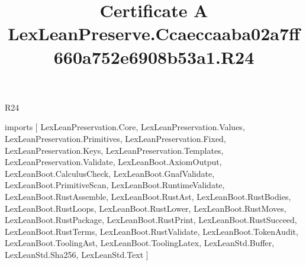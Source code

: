 \begin{lexlean}{R24}
\title{Certificate A LexLeanPreserve.Ccaeccaaba02a7ff660a752e6908b53a1.R24}
\begin{coremodule}
imports [
  LexLeanPreservation.Core,
  LexLeanPreservation.Values,
  LexLeanPreservation.Primitives,
  LexLeanPreservation.Fixed,
  LexLeanPreservation.Keys,
  LexLeanPreservation.Templates,
  LexLeanPreservation.Validate,
  LexLeanBoot.AxiomOutput,
  LexLeanBoot.CalculusCheck,
  LexLeanBoot.GnafValidate,
  LexLeanBoot.PrimitiveScan,
  LexLeanBoot.RuntimeValidate,
  LexLeanBoot.RustAssemble,
  LexLeanBoot.RustAst,
  LexLeanBoot.RustBodies,
  LexLeanBoot.RustLoops,
  LexLeanBoot.RustLower,
  LexLeanBoot.RustMoves,
  LexLeanBoot.RustPackage,
  LexLeanBoot.RustPrint,
  LexLeanBoot.RustSucceed,
  LexLeanBoot.RustTerms,
  LexLeanBoot.RustValidate,
  LexLeanBoot.TokenAudit,
  LexLeanBoot.ToolingAst,
  LexLeanBoot.ToolingLatex,
  LexLeanStd.Buffer,
  LexLeanStd.Sha256,
  LexLeanStd.Text
]


\end{coremodule}
\end{lexlean}
